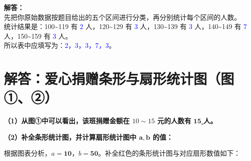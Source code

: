 {\small\color{gray}
\textbf{解答：}\\
先把你原始数据按题目给出的五个区间进行分类，再分别统计每个区间的人数。\\
统计结果是：100\textasciitilde119 有 \textcolor{blue}{2} 人，120\textasciitilde129 有 \textcolor{blue}{3} 人，130\textasciitilde139 有 \textcolor{blue}{3} 人，140\textasciitilde149 有 \textcolor{blue}{7} 人，150\textasciitilde159 有 \textcolor{blue}{3} 人。\\
所以表中应填写为：\textcolor{blue}{2，3，3，7，3}。
}


\newpage



\newpage

\section{解答：爱心捐赠条形与扇形统计图（图①、②）}

\vspace{0.6cm}

\textbf{（1）从图①中可以看出，该班捐赠金额在 $10\sim 15$ 元的人数有} \underline{\quad $\textbf{15}$ \quad} \textbf{人。}

\vspace{0.4cm}

\textbf{（2）补全条形统计图，并计算扇形统计图中 $\boldsymbol{a}, \boldsymbol{b}$ 的值：}

根据图表分析，$a = \boldsymbol{10}$，$b = \boldsymbol{50}$。补全红色的条形统计图与对应扇形数值如下：

\vspace{0.6cm}


